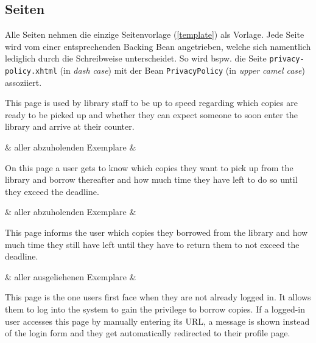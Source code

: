 \documentclass{article}
\begin{document}
\subsection{Seiten}

Alle Seiten nehmen die einzige Seitenvorlage (\ref{template}) als Vorlage.
Jede Seite wird vom einer entsprechenden Backing Bean angetrieben, welche sich namentlich lediglich durch die Schreibweise unterscheidet. So wird bspw. die Seite \texttt{privacy-policy.xhtml} (in \textit{dash case}) mit der Bean \texttt{PrivacyPolicy} (in \textit{upper camel case}) assoziiert.


\Javadoc
This page is used by library staff to be up to speed regarding which copies are ready to be picked up and
whether they can expect someone to soon enter the library and arrive at their counter.

\begin{controls}
    \LST & aller abzuholenden Exemplare & \BIB\\
\end{controls}


\Javadoc
On this page a user gets to know which copies they want to pick up from the library and borrow thereafter
and how much time they have left to do so until they exceed the deadline.

\begin{controls}
    \LST & aller abzuholenden Exemplare & \USR\\
\end{controls}


\Javadoc
This page informs the user which copies they borrowed from the library and how much time they still have left
until they have to return them to not exceed the deadline.

\begin{controls}
    \LST & aller ausgeliehenen Exemplare & \USR\\
\end{controls}


\Javadoc
This page is the one users first face when they are not already logged in.
It allows them to log into the system to gain the privilege to borrow copies.
If a logged-in user accesses this page by manually entering its URL, a message is shown instead of the
login form and they get automatically redirected to their profile page.
\end{document}

